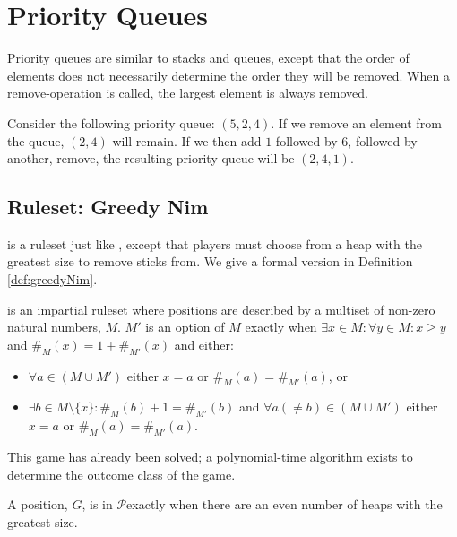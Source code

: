 \documentclass[letter,10pt]{article}
\newcommand{\zero}{\ensuremath{\mathcal{P}}}
\begin{document}
\section{Priority Queues}
\label{section:priorityQueues}

Priority queues are similar to stacks and queues, except that the order of elements does not necessarily determine the order they will be removed.  When a remove-operation is called, the largest element is always removed.

Consider the following priority queue: $(5, 2, 4)$.  If we remove an element from the queue, $(2, 4)$ will remain.  If we then add $1$ followed by $6$, followed by another, remove, the resulting priority queue will be $(2, 4, 1)$.

\subsection{Ruleset: Greedy Nim}

 is a ruleset just like , except that players must choose from a heap with the greatest size to remove sticks from\cite{WinningWays:2001}.  We give a formal version in Definition \ref{def:greedyNim}.



\begin{definition}
	\label{def:greedyNim}
	 is an impartial ruleset where positions are described by a multiset of non-zero natural numbers, $M$.  $M'$ is an option of $M$ exactly when $\exists x \in M: \forall y \in M: x \geq y$ and $\#_M(x) = 1 + \#_{M'}(x)$ and either:
	\begin{itemize}
		\item $\forall a \in (M \cup M')$ either $x = a$ or $\#_M(a) = \#_{M'}(a)$, or
		\item $\exists b \in M \setminus \{x\}: \#_M(b) + 1 = \#_{M'}(b)$ and $\forall a (\neq b) \in (M \cup M')$ either $x = a$ or $\#_M(a) = \#_{M'}(a)$.
	\end{itemize}
\end{definition}

This game has already been solved; a polynomial-time algorithm exists to determine the outcome class of the game\cite{MR2056015}.

\begin{theorem}
	A  position, $G$, is in \zero exactly when there are an even number of heaps with the greatest size.
\end{theorem}
\end{document}
